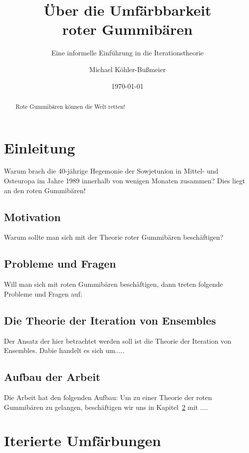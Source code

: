 \documentclass[11pt]{scrartcl}
\title{Über die Umfärbbarkeit\\ roter Gummibären}
\subtitle{Eine informelle Einführung in die Iterationstheorie}
\author{Michael Köhler-Bußmeier}
\date{\today}
\theoremstyle{plain}
\theoremstyle{definition}
\theoremstyle{remark}
\begin{document}
\maketitle
\begin{abstract}
Rote Gummibären können die Welt retten!
\end{abstract}

\tableofcontents





\section{Einleitung}
Warum brach die 40-jährige Hegemonie der Sowjetunion in Mittel- und
Osteuropa im Jahre 1989 innerhalb von wenigen Monaten zusammen?
Dies liegt an den roten Gummibären!



\subsection{Motivation}
Warum sollte man sich mit der Theorie roter Gummibären beschäftigen?



\subsection{Probleme und  Fragen}
Will man sich mit roten Gummibären beschäftigen, dann treten folgende
Probleme und Fragen auf:



\subsection{Die Theorie der Iteration von Ensembles}
Der Ansatz der hier betrachtet werden soll ist die Theorie der
Iteration von Ensembles. Dabie handelt es sich um.....



\subsection{Aufbau der Arbeit}
Die Arbeit hat den folgenden Aufbau: Um zu einer Theorie der roten
Gummibären zu gelangen, beschäftigen wir uns in
Kapitel~\ref{sec:Iterierte-Umfärbungen} mit ....





\section{Iterierte Umfärbungen }\label{sec:Iterierte-Umfärbungen}
\end{document}

